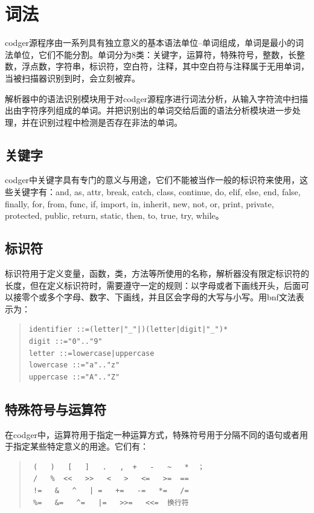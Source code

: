 \section{词法}
codger源程序由一系列具有独立意义的基本语法单位--单词组成，单词是最小的词法单位，它们不能分割。单词分为8类：关键字，运算符，特殊符号，整数，长整数，浮点数，字符串，标识符，空白符，注释，其中空白符与注释属于无用单词，当被扫描器识别到时，会立刻被弃。

解析器中的语法识别模块用于对codger源程序进行词法分析，从输入字符流中扫描出由字符序列组成的单词。并把识别出的单词交给后面的语法分析模块进一步处理，并在识别过程中检测是否存在非法的单词。
\subsection{关键字}
codger中关键字具有专门的意义与用途，它们不能被当作一般的标识符来使用，这些关键字有：and, as, attr, break, catch, class,
continue, do, elif, else, end, false, finally, for, from, func, if, import, in, inherit, new, not, 
or, print, private, protected, public, return, static, then, to, true, try, while。
\subsection{标识符}
标识符用于定义变量，函数，类，方法等所使用的名称，解析器没有限定标识符的长度，但在定义标识符时，需要遵守一定的规则：以字母或者下画线开头，后面可以接零个或多个字母、数字、下画线，并且区会字母的大写与小写。用bnf文法表示为：
\begin{quote}
\begin{verbatim}
identifier ::=(letter|"_"|)(letter|digit|"_")*
digit ::="0".."9"
letter ::=lowercase|uppercase
lowercase ::="a".."z"
uppercase ::="A".."Z"
\end{verbatim}
\end{quote}
\subsection{特殊符号与运算符}
在codger中，运算符用于指定一种运算方式，特殊符号用于分隔不同的语句或者用于指定某些特定意义的用途。它们有：
\begin{quote}
\begin{verbatim}
 (   )   [   ]   .   ,  +   -   ~   *  ；
 /   %  <<   >>   <   >   <=   >=  ==
 !=   &   ^   | =   +=   -=   *=   /= 
 %=   &=   ^=   |=   >>=   <<=  换行符
\end{verbatim}
\end{quote}
